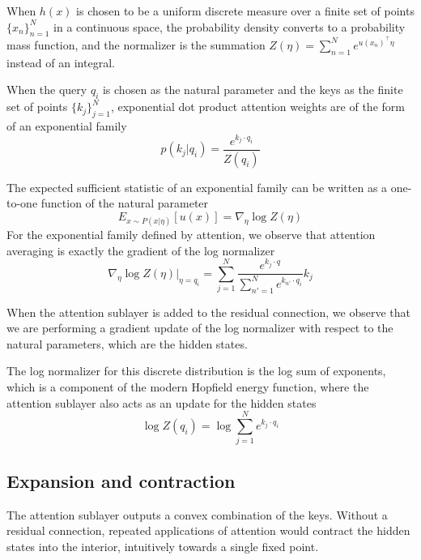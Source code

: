 \documentclass{article}
\begin{document}
When $h(x)$ is chosen to be a uniform discrete measure over a finite set of points 
$\{x_n\}_{n=1}^N $
in a continuous space, the probability density converts to a probability mass function, and the normalizer is the summation 
$Z( \eta ) = \sum_{n=1}^N e^{ u(x_n)^\intercal \eta} $
instead of an integral. 

When the query $q_i$ is chosen as the natural parameter and the keys as the finite set of points $\{ k_j \}_{j=1}^N$, exponential dot product attention weights are of the form of an exponential family
\begin{equation}
  p( k_j \vert q_i ) = 
  \frac
    { e^{k_j \cdot q_i } }
    { Z(q_i) }
  \label{exponential family attention}
\end{equation}

The expected sufficient statistic of an exponential family can be written as a one-to-one function of the natural parameter
\begin{equation}
  E_{ x \sim P( x \vert \eta) } \left[ u(x) \right] =
  \nabla_\eta \log Z(\eta)
  \label{activation function}
\end{equation}
For the exponential family defined by attention, we observe that attention averaging is exactly the gradient of the log normalizer
\begin{equation}
  \nabla_\eta \log Z(\eta) \vert_{\eta = q_i} = 
  \sum_{j=1}^N 
    \frac
      { e^{ k_j \cdot q } }
      { \sum_{n'=1}^N e^{k_{n'} \cdot q_i} }
    k_j
  \label{attention gradient update}
\end{equation}

When the attention sublayer is added to the residual connection, we observe that we are performing a gradient update of the log normalizer with respect to the natural parameters, which are the hidden states.

The log normalizer for this discrete distribution is the log sum of exponents, which is a component of the modern Hopfield energy function, where the attention sublayer also acts as an update for the hidden states
\begin{equation}
  \log Z(q_i) = \log \sum_{j=1}^N e^{ k_j \cdot q_i}
  \label{free energy}
\end{equation}

\subsection{Expansion and contraction}
\label{}

The attention sublayer outputs a convex combination of the keys. Without a residual connection, repeated applications of attention would contract the hidden states into the interior, intuitively towards a single fixed point.
\end{document}
